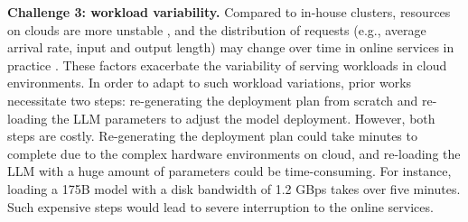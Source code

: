 

 
\noindent \textbf{{Challenge 3: workload variability.}}
Compared to in-house clusters, resources on clouds are more unstable \cite{miao2023spotserve,duan2024parcae,yousif2018cloud,erben2024can}, and the distribution of requests (e.g., average arrival rate, input and output length) may change over time in online services in practice \cite{wang2024burstgpt}.
These factors exacerbate the variability of serving workloads in cloud environments.
In order to adapt to such workload variations, prior works~\cite{zhong2024distserve} necessitate two steps: re-generating the deployment plan from scratch and re-loading the LLM parameters to adjust the model deployment.
However, both steps are costly.
Re-generating the deployment plan could take minutes to complete due to the complex hardware environments on cloud, and re-loading the LLM with a huge amount of parameters could be time-consuming. For instance, loading a 175B model with a disk bandwidth of 1.2 GBps takes over five minutes.
Such expensive steps would lead to severe interruption to the online services.

